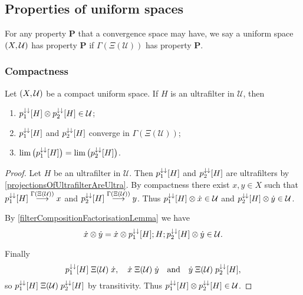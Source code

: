 \subsection{Properties of uniform spaces}
\begin{definition}
For any property $\mathbf{P}$ that a convergence space may have, we say a uniform space $\left( X,\mathcal{U} \right)$ has property $\mathbf{P}$ if $\Gamma(\Xi(\mathcal{U}))$ has property $\mathbf{P}$.
\end{definition}

\subsubsection{Compactness}
\begin{proposition} \label{compactUltrafilterFactorisation}
Let $\left( X,\mathcal{U} \right)$ be a compact uniform space. If $H$ is an ultrafilter in $\mathcal{U}$, then 
\begin{enumerate}
\item $p_1^{\downarrow\downarrow}[H]\otimes p_2^{\downarrow\downarrow}[H] \in\mathcal{U}$;
\item $p_1^{\downarrow\downarrow}[H]$ and $p_2^{\downarrow\downarrow}[H]$ converge in $\Gamma(\Xi(\mathcal{U}))$;
\item $\lim\big(p_1^{\downarrow\downarrow}[H]\big) = \lim\big(p_2^{\downarrow\downarrow}[H]\big)$.
\end{enumerate}
\end{proposition}
\begin{proof}
Let $H$ be an ultrafilter in $\mathcal{U}$. Then $p_1^{\downarrow\downarrow}[H]$ and $p_2^{\downarrow\downarrow}[H]$ are ultrafilters by \ref{projectionsOfUltrafilterAreUltra}. By compactness there exist $x,y\in X$ such that $p_1^{\downarrow\downarrow}[H] \overset{\Gamma(\Xi(\mathcal{U}))}{\longrightarrow} x$ and $p_2^{\downarrow\downarrow}[H] \overset{\Gamma(\Xi(\mathcal{U}))}{\longrightarrow} y$. Thus $p_1^{\downarrow\downarrow}[H]\otimes \dot{x}\in\mathcal{U}$ and $p_2^{\downarrow\downarrow}[H]\otimes \dot{y}\in\mathcal{U}$. 

By \ref{filterCompositionFactorisationLemma} we have
\[ \dot{x}\otimes \dot{y} = \dot{x}\otimes p_1^{\downarrow\downarrow}[H]; H; p_2^{\downarrow\downarrow}[H] \otimes \dot{y} \in \mathcal{U}. \]

Finally
\[ p_1^{\downarrow\downarrow}[H] \mathrel{\Xi(\mathcal{U})} \dot{x}, \quad \dot{x} \mathrel{\Xi(\mathcal{U})} \dot{y} \quad\text{and}\quad \dot{y}\mathrel{\Xi(\mathcal{U})} p_2^{\downarrow\downarrow}[H], \]
so $p_1^{\downarrow\downarrow}[H] \mathrel{\Xi(\mathcal{U})} p_2^{\downarrow\downarrow}[H]$ by transitivity. Thus $p_1^{\downarrow\downarrow}[H]\otimes p_2^{\downarrow\downarrow}[H] \in \mathcal{U}$.
\end{proof}

